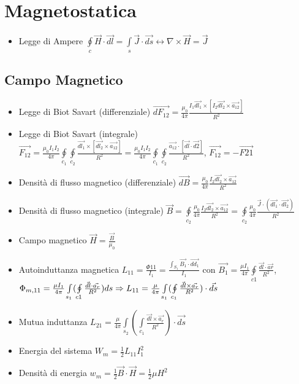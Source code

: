 \documentclass{article}
\begin{document}
\section{Magnetostatica}
\begin{itemize}
	\item Legge di Ampere \( \oint\limits_{c} \vec{H} \cdot \vec{dl} = \int\limits_{s} \vec{J} \cdot \vec{ds} \leftrightarrow \nabla \times \vec{H} = \vec{J} \)
\end{itemize}

\subsection{Campo Magnetico}
\begin{itemize}
	\item Legge di Biot Savart (differenziale) \( \vec{dF_{12}} = \frac{\mu_0}{4 \pi} \frac{I_1 \vec{dl_1} \times [I_2 \vec{dl_2} \times \vec{a_{12}}] }{R^2} \)
	\item Legge di Biot Savart (integrale) \( \vec{F_{12}} = \frac{\mu_0 I_1 I_2}{4 \pi} \oint\limits_{c_1} \oint\limits_{c_2} \frac{\vec{dl_1} \times [\vec{dl_2} \times \vec{a_{12}}]} {R^2} = \frac{\mu_0 I_1 I_2}{4 \pi} \oint\limits_{c_1} \oint\limits_{c_2} \frac{\vec{a_{12}} \cdot [\vec{dl} \cdot \vec{d2}]} {R^2} \), \(\vec{F_{12}} = - \vec{F{21}} \)
	\item Densità di flusso magnetico (differenziale) \( \vec{dB} = \frac{\mu_0}{4 \pi} \frac{I_2 \vec{dl_2} \times \vec{a_{12}}}{R^2} \)
	\item Densità di flusso magnetico (integrale) \( \vec{B} = \oint\limits_{c_2} \frac{\mu_0}{4 \pi} \frac{I_2 \vec{dl_2} \times \vec{a_{12}}}{R^2} = \oint\limits_{c_2} \frac{\mu_0}{4 \pi} \frac{\vec{J} \cdot ( \vec{dl_{1}} \cdot \vec{dl_2} )}{R^2}\)
	\item Campo magnetico \( \vec{H} = \frac{\vec{B}}{\mu_0} \)
	\item Autoinduttanza magnetica \(L_{11} = \frac{\Phi{11}}{I_1} = \frac{\int_{S_1} \vec{B_1} \cdot \vec{dd_1}}{I_1} \) con \( \vec{B_1} = \frac{\mu I_1}{4 \pi} \oint\limits_{c1} \frac{\vec{dl} \cdot \vec{ar}}{R^2} \), \(\Phi_{m, 11} = \frac{\mu I_1}{4 \pi} \int\limits_{s_1} ( \oint\limits_{c1} \frac{\vec{dl} \cdot \vec{a_r}}{R^2}) ds \linebreak \Rightarrow L_{11} = \frac{\mu}{4 \pi} \int\limits_{s_1} ( \oint\limits_{c_1} \frac{\vec{dl} \times \vec{a_r}}{R^2}) \cdot \vec{ds}\)
	\item Mutua induttanza \( L_{21} = \frac{\mu}{4 \pi} \int\limits_{s_2} ( \int\limits_{c_1} \frac{\vec{dl} \times \vec{a_r}}{R^2} ) \cdot \vec{ds} \)
	\item Energia del sistema \( W_m = \frac{1}{2} L_{11} I_1^2 \)
	\item Densità di energia  \( w_m = \frac{1}{2} \vec{B} \cdot \vec{H} = \frac{1}{2} \mu H^2 \)
\end{itemize}
\end{document}
